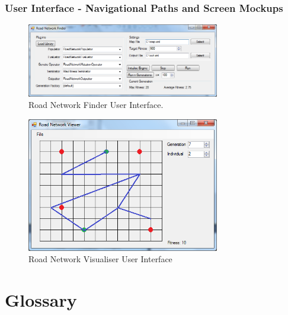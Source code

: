 \clearpage

\subsubsection{User Interface - Navigational Paths and Screen Mockups}
\begin{figure}[ht!]
 \caption{Road Network Finder User Interface.}
 \centering
 \includegraphics[width=0.75\textwidth]{../Finder.png}
\end{figure}

\begin{figure}[ht!]
 \caption{Road Network Visualiser User Interface}
 \centering
 \includegraphics[width=0.75\textwidth]{../Visualiser.png}
\end{figure}

\clearpage

\section{Glossary}


